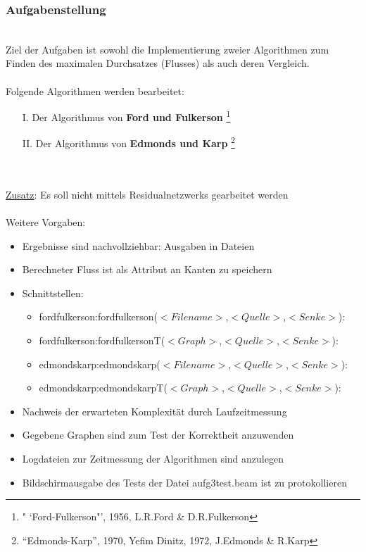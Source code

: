 \documentclass[11pt]{article}
\begin{document}
    \subsubsection{Aufgabenstellung}\\
    Ziel der Aufgaben ist sowohl die Implementierung zweier Algorithmen zum Finden des maximalen Durchsatzes (Flusses) als auch deren Vergleich.\\~\\
    Folgende Algorithmen werden bearbeitet:
    \begin{itemize}
        \item[I.] Der Algorithmus von \textbf{Ford und Fulkerson} \footnote[1]{" `Ford-Fulkerson"', 1956, L.R.Ford \& D.R.Fulkerson}
        \item[II.] Der Algorithmus von \textbf{Edmonds und Karp} \footnote[2]{"`Edmonds-Karp"', 1970, Yefim Dinitz, 1972, J.Edmonds \& R.Karp}
    \end{itemize}\\~\\
    \underline{Zusatz}: Es soll nicht mittels Residualnetzwerks gearbeitet werden\\~\\
    Weitere Vorgaben:
    \begin{itemize}
        \item Ergebnisse sind nachvollziehbar: Ausgaben in Dateien
        \item Berechneter Fluss ist als Attribut an Kanten zu speichern
        \newpage
        \item Schnittstellen:
        \begin{itemize}
            \item fordfulkerson:fordfulkerson($<Filename>$,$<Quelle>$,$<Senke>$):\\ 
            \item fordfulkerson:fordfulkersonT($<Graph>$,$<Quelle>$,$<Senke>$):\\ 
            \item edmondskarp:edmondskarp($<Filename>$,$<Quelle>$,$<Senke>$):\\ 
            \item edmondskarp:edmondskarpT($<Graph>$,$<Quelle>$,$<Senke>$):\\ 
        \end{itemize}
        \item Nachweis der erwarteten Komplexit\"at durch Laufzeitmessung
        \item Gegebene Graphen sind zum Test der Korrektheit anzuwenden
        \item Logdateien zur Zeitmessung der Algorithmen sind anzulegen
        \item Bildschirmausgabe des Tests der Datei aufg3test.beam ist zu protokollieren
    \end{itemize}
\end{document}
